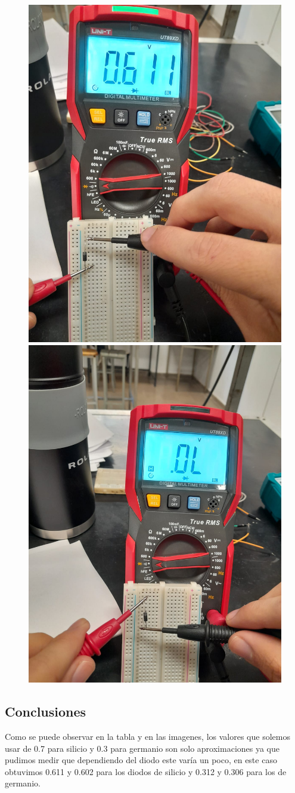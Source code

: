 \begin{figure}[h!]
    \centering
    \includegraphics[width=0.45\linewidth]{imagenes/silicio_directa.jpg}
    \hspace{0.05\linewidth}
    \includegraphics[width=0.45\linewidth]{imagenes/silicio_inversa.jpg}
\end{figure}

\subsection{Conclusiones}
Como se puede observar en la tabla y en las imagenes, los valores que solemos usar de 0.7 para silicio y 0.3 para germanio son solo aproximaciones ya que pudimos medir que dependiendo del diodo este varía un poco, en este caso obtuvimos 0.611 y 0.602 para los diodos de silicio y 0.312 y 0.306 para los de germanio.